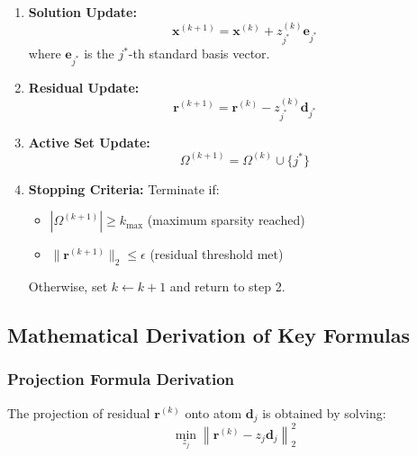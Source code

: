 \documentclass[12pt]{article}
\begin{document}
\begin{algorithm}
\begin{enumerate}
        \item \textbf{Solution Update:}
              \begin{equation}\label{eq:mp_solution_update}
                  \mathbf{x}^{(k+1)} = \mathbf{x}^{(k)} + z_{j^*}^{(k)} \mathbf{e}_{j^*}
              \end{equation}
              where $\mathbf{e}_{j^*}$ is the $j^*$-th standard basis vector.

        \item \textbf{Residual Update:}
              \begin{equation}\label{eq:mp_residual_update}
                  \mathbf{r}^{(k+1)} = \mathbf{r}^{(k)} - z_{j^*}^{(k)} \mathbf{d}_{j^*}
              \end{equation}

        \item \textbf{Active Set Update:}
              \begin{equation}
                  \Omega^{(k+1)} = \Omega^{(k)} \cup \{j^*\}
              \end{equation}

        \item \textbf{Stopping Criteria:} Terminate if:
              \begin{itemize}
                  \item $|\Omega^{(k+1)}| \geq k_{\max}$ (maximum sparsity reached)
                  \item $\|\mathbf{r}^{(k+1)}\|_2 \leq \epsilon$ (residual threshold met)
              \end{itemize}
              Otherwise, set $k \leftarrow k+1$ and return to step 2.
    \end{enumerate}
\end{algorithm}

\newpage

\subsection{Mathematical Derivation of Key Formulas}

\subsubsection{Projection Formula Derivation}

The projection of residual $\mathbf{r}^{(k)}$ onto atom $\mathbf{d}_j$ is obtained by solving:
\begin{equation}\label{eq:projection_problem}
    \min_{z_j} \left\|\mathbf{r}^{(k)} - z_j \mathbf{d}_j\right\|_2^2
\end{equation}
\end{document}
